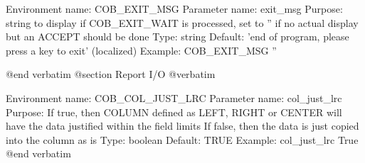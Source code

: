 Environment name:  COB_EXIT_MSG
  Parameter name:  exit_msg
         Purpose:  string to display if COB_EXIT_WAIT is processed, set to ''
                   if no actual display but an ACCEPT should be done
            Type:  string
         Default:  'end of program, please press a key to exit' (localized)
         Example:  COB_EXIT_MSG ''


@end verbatim
@section Report I/O
@verbatim


Environment name:  COB_COL_JUST_LRC
  Parameter name:  col_just_lrc
         Purpose:  If true, then COLUMN defined as LEFT, RIGHT or CENTER
                   will have the data justified within the field limits
                   If false, then the data is just copied into the column as is
            Type:  boolean
         Default:  TRUE
         Example:  col_just_lrc True
@end verbatim
